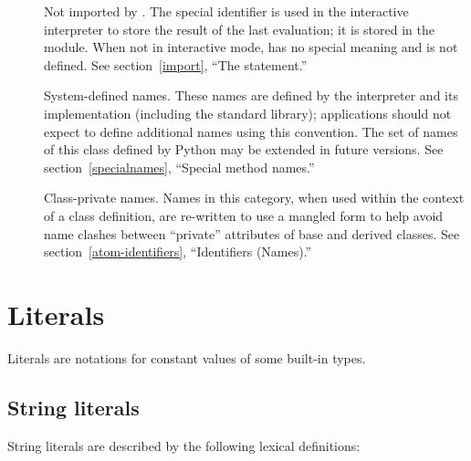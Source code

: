 \begin{description}

\item[\code{_*}]
  Not imported by .  The special
  identifier \samp{_} is used in the interactive interpreter to store
  the result of the last evaluation; it is stored in the
   module.  When not in interactive mode, \samp{_}
  has no special meaning and is not defined.
  See section~\ref{import}, ``The  statement.''


\item[\code{__*__}]
  System-defined names.  These names are defined by the interpreter
  and its implementation (including the standard library);
  applications should not expect to define additional names using this
  convention.  The set of names of this class defined by Python may be
  extended in future versions.
  See section~\ref{specialnames}, ``Special method names.''

\item[\code{__*}]
  Class-private names.  Names in this category, when used within the
  context of a class definition, are re-written to use a mangled form
  to help avoid name clashes between ``private'' attributes of base
  and derived classes.
  See section~\ref{atom-identifiers}, ``Identifiers (Names).''

\end{description}


\section{Literals\label{literals}}

Literals are notations for constant values of some built-in types.


\subsection{String literals\label{strings}}

String literals are described by the following lexical definitions:

